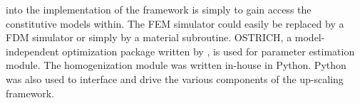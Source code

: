 into the implementation of the framework is simply to gain access the constitutive models within.  The FEM simulator could easily be replaced by a FDM simulator or simply by a material subroutine.  OSTRICH, a model-independent optimization package written by \citet{matott_ostrich:_2016}, is used for parameter estimation module. The homogenization module was written in-house in Python. Python was also used to interface and drive the various components of the up-scaling framework. 




